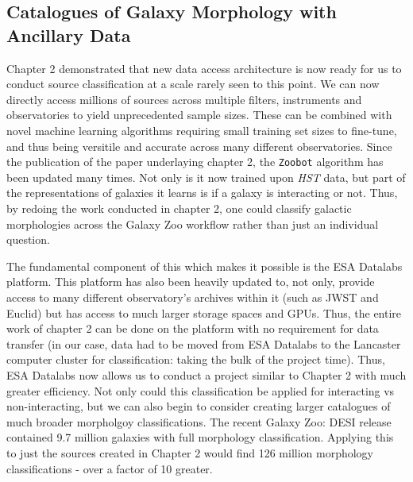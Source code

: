 \subsection{Catalogues of Galaxy Morphology with Ancillary Data}
\noindent Chapter 2 demonstrated that new data access architecture is now ready for us to conduct source classification at a scale rarely seen to this point. We can now directly access millions of sources across multiple filters, instruments and observatories to yield unprecedented sample sizes. These can be combined with novel machine learning algorithms requiring small training set sizes to fine-tune, and thus being versitile and accurate across many different observatories. Since the publication of the paper underlaying chapter 2, the \texttt{Zoobot} algorithm has been updated many times. Not only is it now trained upon \textit{HST} data, but part of the representations of galaxies it learns is if a galaxy is interacting or not. Thus, by redoing the work conducted in chapter 2, one could classify galactic morphologies across the Galaxy Zoo workflow rather than just an individual question.

The fundamental component of this which makes it possible is the ESA Datalabs platform. This platform has also been heavily updated to, not only, provide access to many different observatory's archives within it (such as JWST and Euclid) but has access to much larger storage spaces and GPUs. Thus, the entire work of chapter 2 can be done on the platform with no requirement for data transfer (in our case, data had to be moved from ESA Datalabs to the Lancaster computer cluster for classification: taking the bulk of the project time). Thus, ESA Datalabs now allows us to conduct a project similar to Chapter 2 with much greater efficiency. Not only could this classification be applied for interacting vs non-interacting, but we can also begin to consider creating larger catalogues of much broader morpholgoy classifications. The recent Galaxy Zoo: DESI release contained 9.7 million galaxies with full morphology classification. Applying this to just the sources created in Chapter 2 would find 126 million morphology classifications - over a factor of 10 greater.

